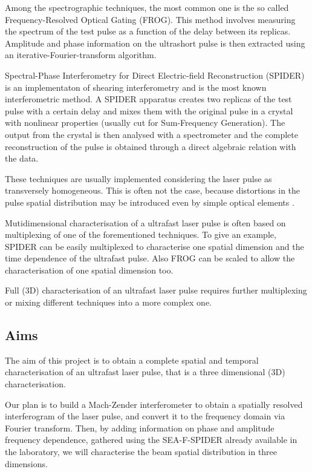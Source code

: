 \documentclass[12pt,a4paper,twoside]{article}
\begin{document}
Among the spectrographic techniques, the most common one is the so called Frequency-Resolved Optical Gating (FROG).
This method involves measuring the spectrum of the test pulse as a function of the delay between its replicas.
Amplitude and phase information on the ultrashort pulse is then extracted using an iterative-Fourier-transform algorithm.

Spectral-Phase Interferometry for Direct Electric-field Reconstruction (SPIDER) is an implementaton of shearing interferometry and is the most known interferometric method.
A SPIDER apparatus creates two replicas of the test pulse with a certain delay and mixes them with the original pulse in a crystal with nonlinear properties (usually cut for Sum-Frequency Generation).
The output from the crystal is then analysed with a spectrometer and the complete reconstruction of the pulse is obtained through a direct algebraic relation with the data.

These techniques are usually implemented considering the laser pulse as transversely homogeneous.
This is often not the case, because distortions in the pulse spatial distribution may be introduced even by simple optical elements \cite{bor}.

Mutidimensional characterisation of a ultrafast laser pulse is often based on multiplexing of one of the forementioned techniques.
To give an example, SPIDER can be easily multiplexed to characterise one spatial dimension and the time dependence of the ultrafast pulse.
Also FROG can be scaled to allow the characterisation of one spatial dimension too.

Full (3D) characterisation of an ultrafast laser pulse requires further multiplexing or mixing different techniques into a more complex one.

\subsection{Aims}
The aim of this project is to obtain a complete spatial and temporal characterisation of an ultrafast laser pulse, that is a three dimensional (3D) characterisation.

Our plan is to build a Mach-Zender interferometer to obtain a spatially resolved interferogram of the laser pulse, and convert it to the frequency domain via Fourier transform.
Then, by adding information on phase and amplitude frequency dependence, gathered using the SEA-F-SPIDER already available in the laboratory, we will characterise the beam spatial distribution in three dimensions.
\end{document}
